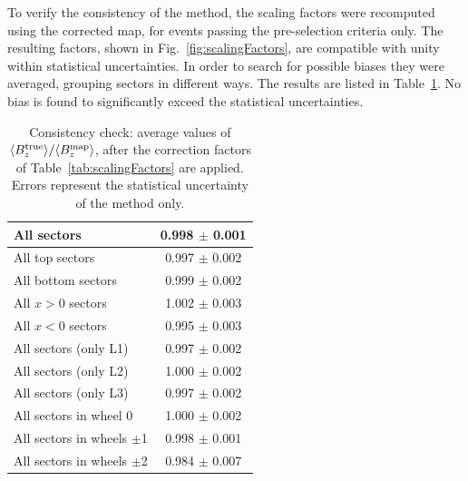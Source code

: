 To verify the consistency of the method, the scaling factors were
recomputed using the corrected map, for events passing the
pre-selection criteria only.
The resulting factors, shown in Fig.~\ref{fig:scalingFactors}, are
compatible with unity within statistical uncertainties.
In order to search for possible biases they were averaged, grouping sectors in
different ways. The results are listed in
Table~\ref{tab:closureTest}. No bias is found to significantly exceed
the statistical uncertainties.
\begin{table}
\begin{center}
\caption{Consistency check: average values of $\langle{B_z^{\rm true}}\rangle/\langle{B_z^{\rm map}}\rangle$, after
  the correction factors of Table~\ref{tab:scalingFactors} are applied.
  Errors represent the statistical uncertainty of the method
  only.
}
\label{tab:closureTest}
\vspace{3mm}
\begin{tabular}{lc}
\hline
All sectors                  & 0.998 $\pm$ 0.001\\
\hline
All top sectors              & 0.997 $\pm$ 0.002\\
All bottom sectors           & 0.999 $\pm$ 0.002\\
All $x>0$ sectors            & 1.002 $\pm$ 0.003\\
All $x<0$ sectors            & 0.995 $\pm$ 0.003\\
\hline
All sectors (only L1)        & 0.997 $\pm$ 0.002\\
All sectors (only L2)        & 1.000 $\pm$ 0.002\\
All sectors (only L3)        & 0.997 $\pm$ 0.002\\
\hline
All sectors in wheel 0       & 1.000 $\pm$ 0.002\\
All sectors in wheels $\pm$1 & 0.998 $\pm$ 0.001\\
All sectors in wheels $\pm$2 & 0.984 $\pm$ 0.007\\
\hline
\end{tabular}
\end{center}
\end{table}
